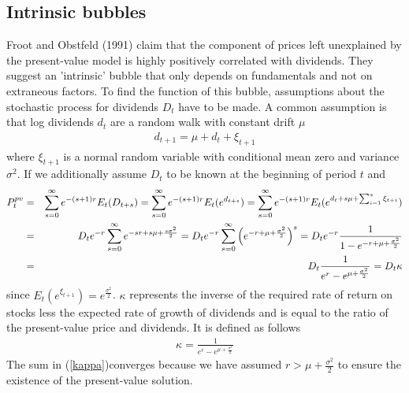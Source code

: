 \documentclass{article}
\begin{document}
\subsection{Intrinsic bubbles}
Froot and Obstfeld (1991) claim that the component of prices left unexplained by the present-value model is highly positively correlated with dividends. They suggest an 'intrinsic' bubble that only depends on fundamentals and not on extraneous factors. To find the function of this bubble, assumptions about the stochastic process for dividends $D_t$ have to be made. A common assumption is that log dividends $d_t$ are a random walk \footnotemark with constant drift $\mu$
\begin{eqnarray}
d_{t+1} = \mu + d_t + \xi_{t+1} \label{lognormal}
\end{eqnarray}
where $\xi_{t+1}$ is a normal random variable with conditional mean zero and variance $\sigma^2$. If we additionally assume $D_t$ to be known at the beginning of period $t$ and 
\begin{eqnarray}
P_t^{pv} &=&  \sum_{s=0}^{\infty}e^{-(s+1)r}E_t(D_{t+s}) = \sum_{s=0}^{\infty}e^{-(s+1)r}E_t(e^{d_{t+s}}) = \sum_{s=0}^{\infty}e^{-(s+1)r}E_t(e^{d_t + s\mu + \sum_{i=1}^{s} \xi_{t+i}}) \notag \\
 &=& D_t e^{-r} \sum_{s=0}^{\infty} e^{-sr + s\mu + \frac{s\sigma^2}{2}} = D_t e^{-r} \sum_{s=0}^{\infty} \left(e^{-r + \mu + \frac{\sigma^2}{2}}\right)^s
 = D_t e^{-r} \frac{1}{1 - e^{-r + \mu + \frac{\sigma^2}{2}}} \notag \\ 
 &=& D_t \frac{1}{e^r - e^{\mu + \frac{\sigma^2}{2}}} = D_t \kappa \label{kappa}
\end{eqnarray}
since $E_t(e^{\xi_{t+1}}) = e^{\frac{\sigma^2}{2}}$.  $\kappa$ represents the inverse of the required rate of return on stocks less the expected rate of growth of dividends and is equal to the ratio of the present-value price and dividends. It is defined as follows
\begin{eqnarray}
\kappa = \frac{1}{e^r - e^{\mu + \frac{\sigma^2}{2}}}  \label{eqkappa}
\end{eqnarray}
 The sum in (\ref{kappa})converges because we have assumed $r > \mu + \frac{\sigma^2}{2}$ to ensure the existence of the present-value solution.
\end{document}
